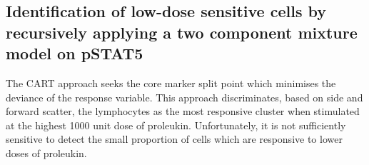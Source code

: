 

%



\subsection{Identification of low-dose sensitive cells by recursively applying a two component mixture model on pSTAT5}

The CART approach seeks the core marker split point which minimises the deviance of the response variable.
This approach discriminates, based on side and forward scatter, the lymphocytes as the most responsive cluster
when stimulated at the highest 1000 unit dose of proleukin.
Unfortunately, it is not sufficiently sensitive to detect the small proportion of cells which are responsive to lower doses of proleukin.

